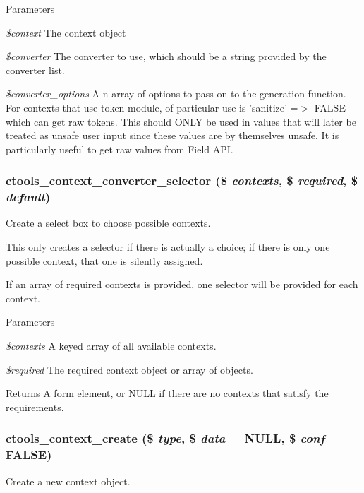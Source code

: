 \begin{DoxyParams}{Parameters}
\item[{\em \$context}]The context object \item[{\em \$converter}]The converter to use, which should be a string provided by the converter list. \item[{\em \$converter\_\-options}]A n array of options to pass on to the generation function. For contexts that use token module, of particular use is 'sanitize' =$>$ FALSE which can get raw tokens. This should ONLY be used in values that will later be treated as unsafe user input since these values are by themselves unsafe. It is particularly useful to get raw values from Field API. \end{DoxyParams}
\hypertarget{context_8inc_a58d73deb6d68d9b36b8221c92df3e5e7}{
\subsubsection[{ctools\_\-context\_\-converter\_\-selector}]{\setlength{\rightskip}{0pt plus 5cm}ctools\_\-context\_\-converter\_\-selector (\$ {\em contexts}, \/  \$ {\em required}, \/  \$ {\em default})}}
\label{context_8inc_a58d73deb6d68d9b36b8221c92df3e5e7}
Create a select box to choose possible contexts.

This only creates a selector if there is actually a choice; if there is only one possible context, that one is silently assigned.

If an array of required contexts is provided, one selector will be provided for each context.


\begin{DoxyParams}{Parameters}
\item[{\em \$contexts}]A keyed array of all available contexts. \item[{\em \$required}]The required context object or array of objects.\end{DoxyParams}
\begin{DoxyReturn}{Returns}
A form element, or NULL if there are no contexts that satisfy the requirements. 
\end{DoxyReturn}
\hypertarget{context_8inc_aaaf945e810dc48a1cf4643c8cb3844d9}{
\subsubsection[{ctools\_\-context\_\-create}]{\setlength{\rightskip}{0pt plus 5cm}ctools\_\-context\_\-create (\$ {\em type}, \/  \$ {\em data} = {\ttfamily NULL}, \/  \$ {\em conf} = {\ttfamily FALSE})}}
\label{context_8inc_aaaf945e810dc48a1cf4643c8cb3844d9}
Create a new context object.


